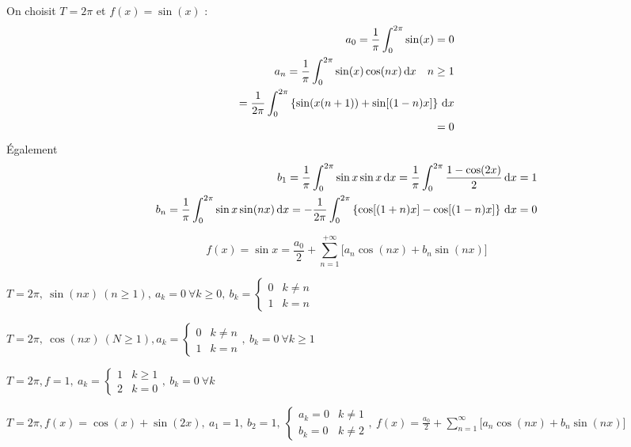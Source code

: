 \documentclass[12pt,a4paper]{article}
\begin{document}
On choisit $T = 2\pi$ et $f(x) = \sin(x)$ :
\begin{align*}
	a_0 =  \frac{1}{\pi} \int_0^{2\pi} \sin(x) = 0\\
	a_n = \frac{1}{\pi} \int_0^{2\pi} \sin(x) \cos(nx) \, \mathrm d x \quad n\geq 1\\
	= \frac{1}{2\pi} \int_0^{2\pi} \left\{\sin(x(n+1)) + \sin[(1-n)x]\right\} \, \mathrm d x\\
	=0
\end{align*}
Également
\begin{align*}
	b_1 = \frac{1}{\pi}\int_0^{2\pi} \sin x \sin x \, \mathrm d x = \frac{1}{\pi}\int_0^{2\pi} \frac{1-\cos(2x)}{2}\, \mathrm d x = 1\\
	b_n = \frac{1}{\pi}\int_0^{2\pi} \sin x \sin(nx) \, \mathrm d x = -\frac{1}{2\pi}\int_0^{2\pi}\left\{\cos[(1+n)x] - \cos[(1-n)x]\right\}\, \mathrm d x = 0
\end{align*}

\[f(x) = \sin x = \frac{a_0}{2} + \sum_{n=1}^{+\infty}\Big[a_n\cos(nx) + b_n\sin(nx)\Big]\]

 $T = 2\pi,\ \sin(nx)\ (n\geq 1),\ a_k = 0\ \forall k \geq 0,\ b_k = \left\{\begin{array}{ll}
0 & k\neq n\\
1 & k=n
\end{array}\right.$

 $T = 2\pi,\ \cos(nx)\ (N\geq 1), a_k = \left\{\begin{array}{ll}
0 & k\neq n\\
1 & k=n
\end{array}\right.,\ b_k = 0\ \forall k \geq 1$

 $T = 2\pi, f=1,\ a_k = \left\{\begin{array}{ll}
1 & k\geq 1\\
2 & k=0
\end{array}\right.,\ b_k = 0\ \forall k$

 $T = 2\pi, f(x) = \cos(x) + \sin(2x),\ a_1 = 1,\ b_2 = 1,\ \left\{\begin{array}{ll}
a_k = 0 & k \neq 1\\
b_k = 0 & k \neq 2
\end{array}\right.,\ f(x) = \frac{a_0}{2} + \sum_{n=1}^{\infty} \big[a_n\cos(nx) +b_n\sin(nx) \big]$
\end{document}
